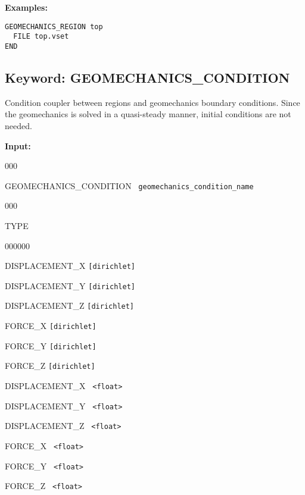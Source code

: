 \begin{mdframed}

{\noindent\bf
Examples:}

\begin{verbatim}
GEOMECHANICS_REGION top 
  FILE top.vset 
END
\end{verbatim}

\end{mdframed}

\hyperlink{target_key}{\return}


\newpage
\protect\hypertarget{target_geomech_condition}{}
 
\subsection{Keyword: GEOMECHANICS\_CONDITION}

 Condition coupler between regions and geomechanics boundary conditions. Since the geomechanics is solved in a quasi-steady manner, initial conditions are not needed. 


{\noindent\bf Input:}
\begin{deflist}{000}
\item [GEOMECHANICS\_CONDITION] \ {\tt geomechanics\_condition\_name}
\begin{deflist}{000}
\item[TYPE] ~

\begin{deflist}{000000}
\item[DISPLACEMENT\_X] {\tt [dirichlet]}
\item[DISPLACEMENT\_Y] {\tt [dirichlet]}
\item[DISPLACEMENT\_Z] {\tt [dirichlet]}
\item[FORCE\_X] {\tt [dirichlet]}
\item[FORCE\_Y] {\tt [dirichlet]}
\item[FORCE\_Z] {\tt [dirichlet]}
\end{deflist}
\item[\keyend]
\item[DISPLACEMENT\_X] \ {\tt <float>}
\item[DISPLACEMENT\_Y] \ {\tt <float>}
\item[DISPLACEMENT\_Z] \ {\tt <float>}
\item[FORCE\_X] \ {\tt <float>}
\item[FORCE\_Y] \ {\tt <float>}
\item[FORCE\_Z] \ {\tt <float>}
\end{deflist}
\item[\keyend] ~
\end{deflist}

